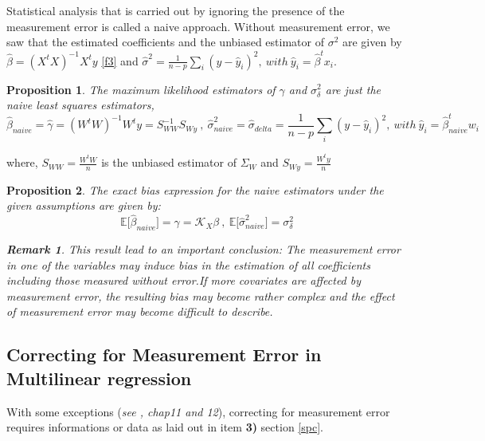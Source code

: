 \documentclass[12pt]{report}
\newtheorem {proposition}{Proposition}[section]  %
\newtheorem{remarque}{Remark}[section]
\begin{document}
	Statistical analysis that is carried out by ignoring the presence of the measurement error is called a naive approach.
	Without measurement error, we saw that the estimated coefficients and the unbiased estimator of $\sigma^{2}$ are given by $\hat{\beta}=(X^{t}X)^{-1}X^{t}y$ \eqref{f3}  and $\hat{\sigma}^{2}=\frac{1}{n-p}\sum_{i}(y-\hat{y}_{i})^{2},\ with\ \hat{y}_{i}=\hat{\beta}^{t}x_{i}$.
	\begin{proposition}
		The maximum likelihood estimators of $\gamma$ and $\sigma_{\delta}^{2}$ are just the naive least squares estimators,
		\begin{equation}
			\hat{\beta}_{naive}=\hat{\gamma}=(W^{t}W)^{-1}W^{t}y=S_{WW}^{-1}S_{Wy}\ ,\ \hat{\sigma}^{2}_{naive}=\hat{\sigma}_{delta}=\frac{1}{n-p}\sum_{i}(y-\hat{y}_{i})^{2},\ with\ \hat{y}_{i}=\hat{\beta}^{t}_{naive}w_{i}
			\label{f51}
		\end{equation}
	\end{proposition}
	where, $S_{WW}=\frac{W^{t}W}{n}$ is the unbiased estimator of $\Sigma_{W}$ and $S_{Wy}=\frac{W^{t}y}{n}$
	\begin{proposition}
		The exact bias expression for the naive estimators under the given assumptions are given by:
		\begin{equation}
			\mathbb{E}\big[\hat{\beta}_{naive}\big]=\gamma=\mathcal{K}_{X}\beta \ , \ \mathbb{E}\big[\hat{\sigma}_{naive}^{2}\big]=\sigma^{2}_{\delta }
			\label{f52}
		\end{equation}
	\begin{remarque}
		This result lead to an important conclusion: The measurement error in one of the variables may induce bias in the estimation of all coefficients including those measured without error.If more covariates are affected by measurement error, the resulting bias may become rather complex and the effect of measurement error may become difficult to describe.
	\end{remarque}
	\end{proposition}
\begin{center}
	\subsection{Correcting for Measurement Error in Multilinear regression}
\end{center}

With some exceptions (\textit{see \cite{nref1}, chap11 and 12}), correcting for measurement error requires informations or data as laid out in item \textbf{3)} section \ref{spc}.
\end{document}
